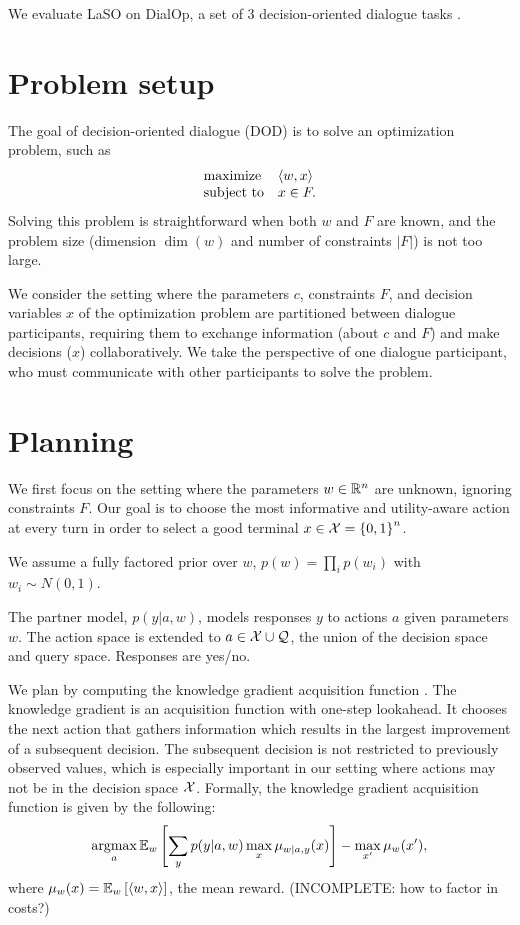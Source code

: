 \documentclass[11pt]{article}
\begin{document}
We evaluate LaSO on DialOp, a set of 3 decision-oriented dialogue tasks \citep{lin2023decision}.

\section{Problem setup}
The goal of decision-oriented dialogue (DOD) is to solve an optimization problem, such as
\begin{equation}
\label{eqn:obj}
\begin{array}{ll}
\mbox{maximize} & \left\langle w,x\right\rangle\\
\mbox{subject to} & x \in F.
\end{array}
\end{equation}
Solving this problem is straightforward when both $w$ and $F$ are known,
and the problem size (dimension $\dim(w)$ and number of constraints $|F|$) is not too large.

We consider the setting where the parameters $c$, constraints $F$, and decision variables $x$ of the optimization problem are partitioned between dialogue participants, requiring them to exchange information (about $c$ and $F$) and make decisions  ($x$) collaboratively.
We take the perspective of one dialogue participant, who must communicate with other participants to solve the problem.

\section{Planning}
We first focus on the setting where the parameters $w\in\mathbb{R}^n$ are unknown, ignoring constraints $F$.
Our goal is to choose the most informative and utility-aware action at every turn in order to select a good terminal $x\in\mathcal{X} = \left\{0,1\right\}^n$.

We assume a fully factored prior over $w$, $p(w) = \prod_i p(w_i)$ with $w_i\sim N(0,1)$.

The partner model, $p(y | a,w)$, models responses $y$ to actions $a$ given parameters $w$.
The action space is extended to $a \in \mathcal{X} \cup \mathcal{Q}$, the union of the decision space and query space.
Responses are yes/no.

We plan by computing the knowledge gradient acquisition function \citep{kg}.
The knowledge gradient is an acquisition function with one-step lookahead.
It chooses the next action that gathers information which results in the largest improvement of a subsequent decision.
The subsequent decision is not restricted to previously observed values,
which is especially important in our setting where actions may not be in the decision space $\mathcal{X}$.
Formally, the knowledge gradient acquisition function is given by the following:
\begin{equation}
\label{eqn:kg}
\operatorname*{argmax}_a \mathbb{E}_{w}\left[\sum_y p(y|a,w) \max_x \mu_{w|a,y}(x)\right]
- \max_{x'} \mu_w(x'),
\end{equation}
where $\mu_w(x) = \mathbb{E}_{w}\left[\langle w,x \rangle\right]$, the mean reward.
(INCOMPLETE: how to factor in costs?)
\end{document}

